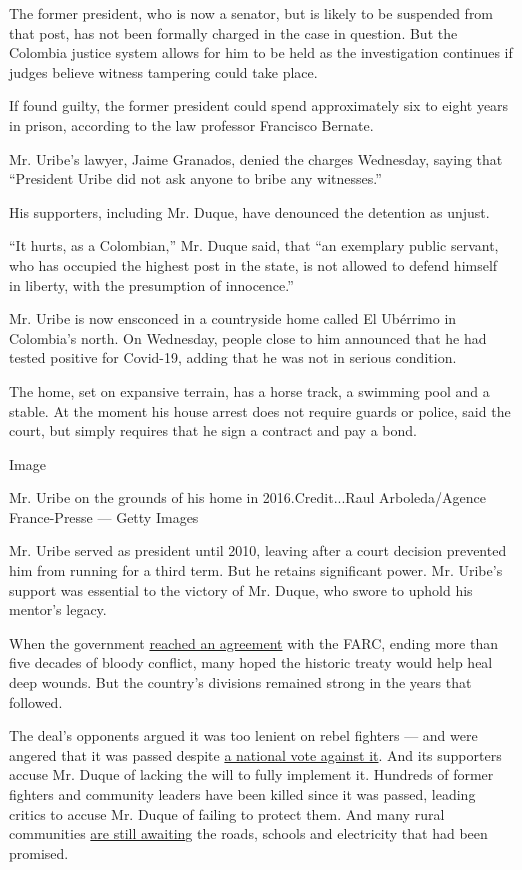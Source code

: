 The former president, who is now a senator, but is likely to be
suspended from that post, has not been formally charged in the case in
question. But the Colombia justice system allows for him to be held as
the investigation continues if judges believe witness tampering could
take place.

If found guilty, the former president could spend approximately six to
eight years in prison, according to the law professor Francisco Bernate.

Mr. Uribe's lawyer, Jaime Granados, denied the charges Wednesday, saying
that ``President Uribe did not ask anyone to bribe any witnesses.''

His supporters, including Mr. Duque, have denounced the detention as
unjust.

``It hurts, as a Colombian,'' Mr. Duque said, that ``an exemplary public
servant, who has occupied the highest post in the state, is not allowed
to defend himself in liberty, with the presumption of innocence.''

Mr. Uribe is now ensconced in a countryside home called El Ubérrimo in
Colombia's north. On Wednesday, people close to him announced that he
had tested positive for Covid-19, adding that he was not in serious
condition.

The home, set on expansive terrain, has a horse track, a swimming pool
and a stable. At the moment his house arrest does not require guards or
police, said the court, but simply requires that he sign a contract and
pay a bond.

Image

Mr. Uribe on the grounds of his home in 2016.Credit...Raul
Arboleda/Agence France-Presse --- Getty Images

Mr. Uribe served as president until 2010, leaving after a court decision
prevented him from running for a third term. But he retains significant
power. Mr. Uribe's support was essential to the victory of Mr. Duque,
who swore to uphold his mentor's legacy.

When the government
\href{https://www.nytimes.com/2016/08/25/world/americas/colombia-farc-peace-deal.html}{reached
an agreement} with the FARC, ending more than five decades of bloody
conflict, many hoped the historic treaty would help heal deep wounds.
But the country's divisions remained strong in the years that followed.

The deal's opponents argued it was too lenient on rebel fighters --- and
were angered that it was passed despite
\href{https://www.nytimes.com/2016/10/03/world/colombia-peace-deal-defeat.html}{a
national vote against it}. And its supporters accuse Mr. Duque of
lacking the will to fully implement it. Hundreds of former fighters and
community leaders have been killed since it was passed, leading critics
to accuse Mr. Duque of failing to protect them. And many rural
communities
\href{https://www.nytimes.com/2019/05/17/world/americas/colombia-farc-peace-deal.html}{are
still awaiting} the roads, schools and electricity that had been
promised.

